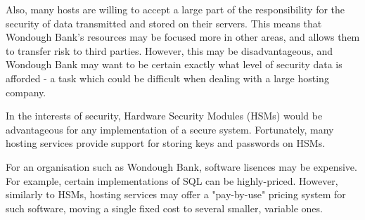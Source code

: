 Also, many hosts are willing to accept a large part of the responsibility for the security of data transmitted and stored on their servers. This means that Wondough Bank's resources may be focused more in other areas, and allows them to transfer risk to third parties. However, this may be disadvantageous, and Wondough Bank may want to be certain exactly what level of security data is afforded - a task which could be difficult when dealing with a large hosting company.


In the interests of security, Hardware Security Modules (HSMs) would be advantageous for any implementation of a secure system. Fortunately, many hosting services provide support for storing keys and passwords on HSMs.


For an organisation such as Wondough Bank, software lisences may be expensive. For example, certain implementations of SQL can be highly-priced. However, similarly to HSMs, hosting services may offer a "pay-by-use" pricing system for such software, moving a single fixed cost to several smaller, variable ones.